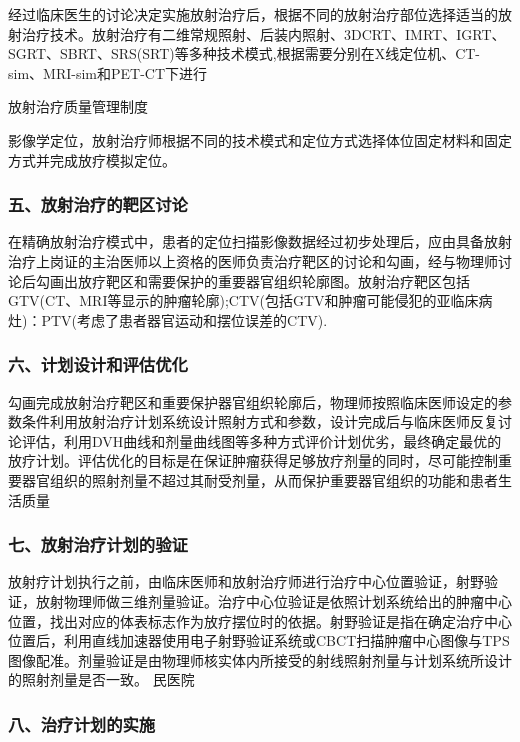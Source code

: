 经过临床医生的讨论决定实施放射治疗后，根据不同的放射治疗部位选择适当的放射治疗技术。放射治疗有二维常规照射、后装内照射、3DCRT、IMRT、IGRT、SGRT、SBRT、SRS(SRT)等多种技术模式,根据需要分别在X线定位机、CT-sim、MRI-sim和PET-CT下进行

放射治疗质量管理制度

影像学定位，放射治疗师根据不同的技术模式和定位方式选择体位固定材料和固定方式并完成放疗模拟定位。

\subsubsection{五、放射治疗的靶区讨论}

在精确放射治疗模式中，患者的定位扫描影像数据经过初步处理后，应由具备放射治疗上岗证的主治医师以上资格的医师负责治疗靶区的讨论和勾画，经与物理师讨论后勾画出放疗靶区和需要保护的重要器官组织轮廓图。放射治疗靶区包括GTV(CT、MRI等显示的肿瘤轮廓);CTV(包括GTV和肿瘤可能侵犯的亚临床病灶)：PTV(考虑了患者器官运动和摆位误差的CTV).

\subsubsection{六、计划设计和评估优化}

勾画完成放射治疗靶区和重要保护器官组织轮廓后，物理师按照临床医师设定的参数条件利用放射治疗计划系统设计照射方式和参数，设计完成后与临床医师反复讨论评估，利用DVH曲线和剂量曲线图等多种方式评价计划优劣，最终确定最优的放疗计划。评估优化的目标是在保证肿瘤获得足够放疗剂量的同时，尽可能控制重要器官组织的照射剂量不超过其耐受剂量，从而保护重要器官组织的功能和患者生活质量

\subsubsection{七、放射治疗计划的验证}

放射疗计划执行之前，由临床医师和放射治疗师进行治疗中心位置验证，射野验证，放射物理师做三维剂量验证。治疗中心位验证是依照计划系统给出的肿瘤中心位置，找出对应的体表标志作为放疗摆位时的依据。射野验证是指在确定治疗中心位置后，利用直线加速器使用电子射野验证系统或CBCT扫描肿瘤中心图像与TPS图像配准。剂量验证是由物理师核实体内所接受的射线照射剂量与计划系统所设计的照射剂量是否一致。 民医院

\subsubsection{八、治疗计划的实施}

